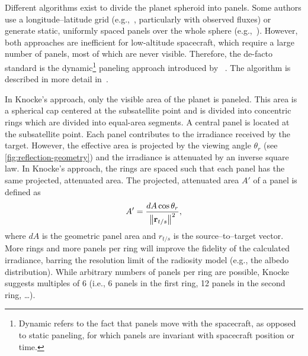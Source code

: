 Different algorithms exist to divide the planet spheroid into panels. Some authors use a longitude--latitude grid (e.g.,~\cite{RodriguezSolano2011a,Woeske2019}, particularly with observed fluxes) or generate static, uniformly spaced panels over the whole sphere (e.g.,~\cite{Wetterer2014}). However, both approaches are inefficient for low-altitude spacecraft, which require a large number of panels, most of which are never visible. Therefore, the de-facto standard is the dynamic\footnote{Dynamic refers to the fact that panels move with the spacecraft, as opposed to static paneling, for which panels are invariant with spacecraft position or time.} paneling approach introduced by \citeauthor{Knocke1988}~\cite{Knocke1988}. The algorithm is described in more detail in~\cite{Knocke1989}.


In Knocke's approach, only the visible area of the planet is paneled. This area is a spherical cap centered at the subsatellite point and is divided into concentric rings which are divided into equal-area segments. A central panel is located at the subsatellite point. Each panel contributes to the irradiance received by the target. However, the effective area is projected by the viewing angle $\theta_r$ (see \cref{fig:reflection-geometry}) and the irradiance is attenuated by an inverse square law. In Knocke's approach, the rings are spaced such that each panel has the same projected, attenuated area. The projected, attenuated area $A'$ of a panel is defined as~\cite{Knocke1988}
\begin{align}
    A' = \frac{dA \cos \theta_r}{\norm{\vb r_{t/s}}^2},
\end{align}
where $dA$ is the geometric panel area and $r_{t/s}$ is the source--to--target vector. More rings and more panels per ring will improve the fidelity of the calculated irradiance, barring the resolution limit of the radiosity model (e.g., the albedo distribution). While arbitrary numbers of panels per ring are possible, Knocke suggests multiples of 6 (i.e., 6 panels in the first ring, 12 panels in the second ring, \dots).

